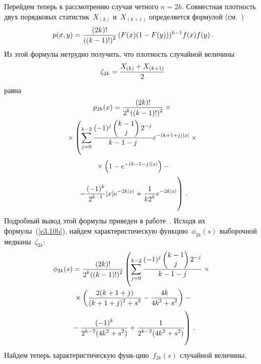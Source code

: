 \begin{multicols}{2}
Перейдем теперь к рассмотрению случая четного $n=2k$.
Совместная плотность двух порядковых статистик~$X_{(k)}$ и~$X_{(k+1)}$
определяется формулой (см.~\cite{4ben})
\begin{equation*}
p(x,y)=\displaystyle\frac{\displaystyle (2k)!\mathstrut}{\displaystyle ((k-1)!)^2\mathstrut}\,(F(x)(1-F(y)))^{k-1}f(x)f(y)\,.
\end{equation*}
Из этой формулы нетрудно получить, что плотность случайной величины
$$
\zeta_{2k}=\displaystyle\frac{\displaystyle X_{(k)}+X_{(k+1)}\mathstrut}{\displaystyle 2\mathstrut}
$$
равна
\begin{multline*}
p_{2k}(x) = \displaystyle\frac{\displaystyle (2k)!\mathstrut}{\displaystyle 2^k ((k-1)!)^2\mathstrut}\times{}\\
{}\times
\left(\sum_{j=0}^{k-2}\displaystyle\frac{\displaystyle (-1)^j
\begin{pmatrix}
k-1\\ j
\end{pmatrix}
2^{-j}\mathstrut}{\displaystyle k-1-j\mathstrut}
e^{-(k+1+j)|x|}\times{}\right.
\end{multline*}
\begin{multline}
\left.{}\times \left(1-e^{-(k-1-j)|x|}\right)- \right.{}\\
{}\left.
- \fr{(-1)^k}{2^{k-1}}|x|e^{-2k|x|} + \fr{1}{k2^k}e^{-2k|x|}
\vphantom{\fr{(-1)^j
\begin{pmatrix}
k-1\\ j
\end{pmatrix}
2^{-j}}{k-1-j}}\right)\,.
\label{e3.10b}
\end{multline}
Подробный вывод этой формулы приведен в работе~\cite{8ben}.
Исходя их формулы~(\ref{e3.10b}), найдем характеристическую функцию~$\phi_{2k}(s)$
выборочной медианы~$\zeta_{2k}$:
\begin{multline*}
\!\phi_{2k}(s)=
\fr{(2k)!}{2^k ((k-1)!)^2}
\left( \sum\limits_{j=0}^{k-2}
\fr{(-1)^j
\begin{pmatrix}
k-1\\ j
\end{pmatrix}
2^{-j}}{k-1-j}\times{}\right.
\\
\left.{}\times
\left(
\fr{2(k+1+j)}{(k+1+j)^2+s^2}  -
 \fr{4k}{4k^2+s^2} \right)-{}\right.\\
\left. {}- 
 \fr{(-1)^k}{2^{k-2}(4k^2+s^2)} + \fr{1}{2^{k-2}(4k^2+s^2)}
 \vphantom{\sum\limits_{j=0}^{k-2}
\fr{(-1)^j
\begin{pmatrix}
k-1\\ j
\end{pmatrix}
2^{-j}}{k-1-j}}
\right)\,.
\end{multline*}
Найдем теперь характеристическую функ-\linebreak цию~$f_{2k}(s)$ случайной величины,

\end{multicols}
